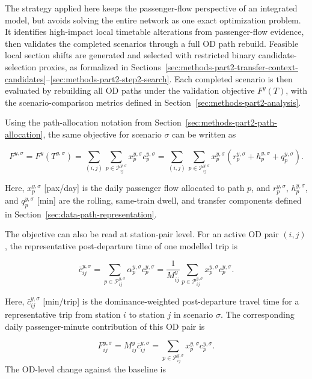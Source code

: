 \documentclass[preprint,12pt]{elsarticle}
\begin{document}
The strategy applied here keeps the passenger-flow perspective of an integrated model, but avoids solving the entire network as one exact optimization problem. It identifies high-impact local timetable alterations from passenger-flow evidence, then validates the completed scenarios through a full OD path rebuild. Feasible local section shifts are generated and selected with restricted binary candidate-selection proxies, as formalized in Sections~\ref{sec:methods-part2-transfer-context-candidates}--\ref{sec:methods-part2-step2-search}. Each completed scenario is then evaluated by rebuilding all OD paths under the validation objective \(F^y(T)\), with the scenario-comparison metrics defined in Section~\ref{sec:methods-part2-analysis}.

Using the path-allocation notation from Section~\ref{sec:methods-part2-path-allocation}, the same objective for scenario \(\sigma\) can be written as

\begin{equation}
F^{y,\sigma}
=
F^y(T^{y,\sigma})
=
\sum_{(i,j)}
\sum_{p\in\mathcal{P}_{ij}^{y,\sigma}}
x_p^{y,\sigma}c_p^{y,\sigma}
=
\sum_{(i,j)}
\sum_{p\in\mathcal{P}_{ij}^{y,\sigma}}
x_p^{y,\sigma}
\left(
r_p^{y,\sigma}+h_p^{y,\sigma}+q_p^{y,\sigma}
\right).
\label{eq:part2-full-objective}
\end{equation}

Here, \(x_p^{y,\sigma}\) [pax/day] is the daily passenger flow allocated to path \(p\), and \(r_p^{y,\sigma}\), \(h_p^{y,\sigma}\), and \(q_p^{y,\sigma}\) [min] are the rolling, same-train dwell, and transfer components defined in Section~\ref{sec:data-path-representation}.

The objective can also be read at station-pair level. For an active OD pair \((i,j)\), the representative post-departure time of one modelled trip is

\begin{equation}
\bar c_{ij}^{y,\sigma}
=
\sum_{p\in\mathcal{P}_{ij}^{y,\sigma}}
\alpha_p^{y,\sigma}c_p^{y,\sigma}
=
\frac{1}{M_{ij}^y}
\sum_{p\in\mathcal{P}_{ij}^{y,\sigma}}
x_p^{y,\sigma}c_p^{y,\sigma}.
\label{eq:part2-od-mean-cost}
\end{equation}

Here, \(\bar c_{ij}^{y,\sigma}\) [min/trip] is the dominance-weighted post-departure travel time for a representative trip from station \(i\) to station \(j\) in scenario \(\sigma\). The corresponding daily passenger-minute contribution of this OD pair is

\begin{equation}
F_{ij}^{y,\sigma}
=
M_{ij}^y\bar c_{ij}^{y,\sigma}
=
\sum_{p\in\mathcal{P}_{ij}^{y,\sigma}}
x_p^{y,\sigma}c_p^{y,\sigma}.
\label{eq:part2-od-passenger-minute-contribution}
\end{equation}
\newpage
The OD-level change against the baseline is
\end{document}
